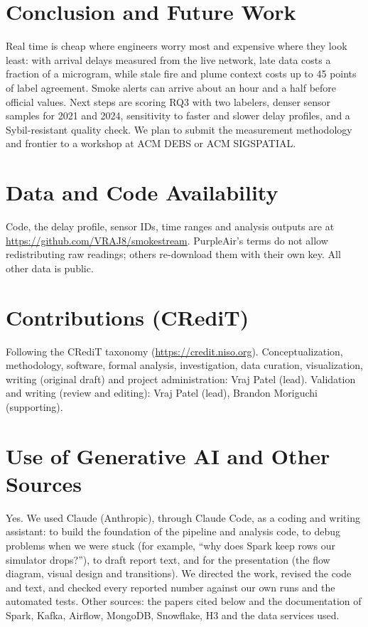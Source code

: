 \documentclass[10pt,journal,compsoc]{IEEEtran}
\begin{document}
\section{Conclusion and Future Work}\label{sec:conclusion}
Real time is cheap where engineers worry most and expensive where they look least: with arrival delays measured from the live network, late data costs a fraction of a microgram, while stale fire and plume context costs up to 45 points of label agreement. Smoke alerts can arrive about an hour and a half before official values. Next steps are scoring RQ3 with two labelers, denser sensor samples for 2021 and 2024, sensitivity to faster and slower delay profiles, and a Sybil-resistant quality check. We plan to submit the measurement methodology and frontier to a workshop at ACM DEBS or ACM SIGSPATIAL.

\section*{Data and Code Availability}
Code, the delay profile, sensor IDs, time ranges and analysis outputs are at \url{https://github.com/VRAJ8/smokestream}. PurpleAir's terms do not allow redistributing raw readings; others re-download them with their own key. All other data is public.

\section*{Contributions (CRediT)}
Following the CRediT taxonomy (\url{https://credit.niso.org}). Conceptualization, methodology, software, formal analysis, investigation, data curation, visualization, writing (original draft) and project administration: Vraj Patel (lead). Validation and writing (review and editing): Vraj Patel (lead), Brandon Moriguchi (supporting).

\section*{Use of Generative AI and Other Sources}
Yes. We used Claude (Anthropic), through Claude Code, as a coding and writing assistant: to build the foundation of the pipeline and analysis code, to debug problems when we were stuck (for example, ``why does Spark keep rows our simulator drops?''), to draft report text, and for the presentation (the flow diagram, visual design and transitions). We directed the work, revised the code and text, and checked every reported number against our own runs and the automated tests. Other sources: the papers cited below and the documentation of Spark, Kafka, Airflow, MongoDB, Snowflake, H3 and the data services used.
\end{document}
